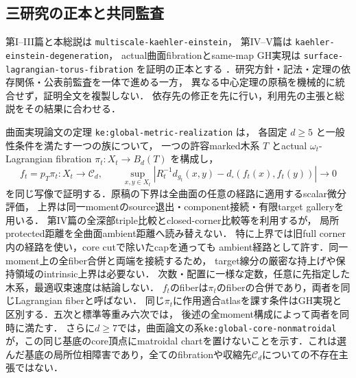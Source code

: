 \documentclass[a4paper,11pt]{ltjsarticle}
\numberwithin{equation}{section}
\theoremstyle{plain}
\theoremstyle{definition}
\theoremstyle{remark}
\newcommand{\cC}{\mathcal C}
\newcommand{\Rt}{R_t}
\begin{document}
\subsection{三研究の正本と共同監査}
第I--III篇と本総説は \texttt{multiscale-kaehler-einstein}，
第IV--V篇は \texttt{kaehler-einstein-degeneration}，
actual曲面fibrationとsame-map GH実現は
\texttt{surface-lagrangian-torus-fibration} を証明の正本とする
\cite{KEIV,KEV,SurfaceKE}．研究方針・記法・定理の依存関係・公表前監査を一体で進める一方，
異なる中心定理の原稿を機械的に統合せず，証明全文を複製しない．
依存先の修正を先に行い，利用先の主張と総説をその結果に合わせる．

曲面実現論文の定理 \texttt{ke:global-metric-realization} は，
各固定 \(d\ge5\) と一般性条件を満たす一つの族について，
一つの許容marked木系 \(T\) とactual \(\omega_t\)-Lagrangian fibration
\(\pi_t:X_t\to B_d(T)\) を構成し，
\[
 f_t=p_T\pi_t:X_t\longrightarrow\cC_d,\qquad
 \sup_{x,y\in X_t}
 \left|\Rt^{-1}d_{g_t}(x,y)
       -d_\square(f_t(x),f_t(y))\right|\longrightarrow0
\]
を同じ写像で証明する．原稿の下界は全曲面の任意の経路に適用するscalar微分評価，
上界は同一momentのsource退出・component接続・有限target galleryを用いる．
第IV篇の全深部triple比較とclosed-corner比較等を利用するが，
局所protected距離を全曲面ambient距離へ読み替えない．
特に上界では旧full corner内の経路を使い，core cutで除いたcapを通っても
ambient経路として許す．同一moment上の全fiber合併と両端を接続するため，
target線分の厳密な持上げや保持領域のintrinsic上界は必要ない．
次数・配置に一様な定数，任意に先指定した木系，最適収束速度は結論しない．
\(f_t\)のfiberは\(\pi_t\)のfiberの合併であり，両者を同じLagrangian fiberと呼ばない．
同じ\(\pi_t\)に作用適合atlasを課す条件はGH実現と区別する．五次と標準等重み六次では，
後述の全moment構成によって両者を同時に満たす．
さらに\(d\ge7\)では，曲面論文の系\texttt{ke:global-core-nonmatroidal}が，この同じ基底のcore頂点にmatroidal chartを置けないことを示す．これは選んだ基底の局所位相障害であり，全てのfibrationや収縮先\(\cC_d\)についての不存在主張ではない．
\end{document}
